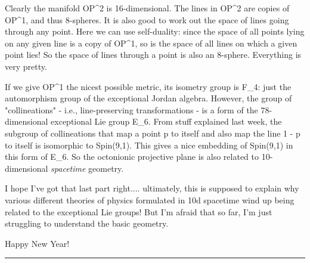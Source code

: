 Clearly the manifold OP^{2} is 16-dimensional.  The lines in
OP^{2} are copies of OP^{1}, and thus 8-spheres.  It is
also good to work out the space of lines going through any point.  Here
we can use self-duality: since the space of all points lying on any
given line is a copy of OP^{1}, so is the space of all lines on
which a given point lies!  So the space of lines through a point is also
an 8-sphere.  Everything is very pretty.


If we give OP^{1} the nicest possible metric, its isometry group
is F_{4}: just the automorphism group of the exceptional Jordan
algebra.  However, the group of "collineations" - i.e.,
line-preserving transformations - is a form of the 78-dimensional
exceptional Lie group E_{6}.  From stuff explained last week,
the subgroup of collineations that map a point p to itself and also map
the line 1 - p to itself is isomorphic to Spin(9,1).  This gives a nice
embedding of Spin(9,1) in this form of E_{6}.  So the octonionic
projective plane is also related to 10-dimensional \emph{spacetime} 
geometry.

I hope I've got that last part right.... ultimately, this is supposed to
explain why various different theories of physics formulated in 10d
spacetime wind up being related to the exceptional Lie groups!  But I'm
afraid that so far, I'm just struggling to understand the basic geometry.

Happy New Year!



 \par\noindent\rule{\textwidth}{0.4pt}

